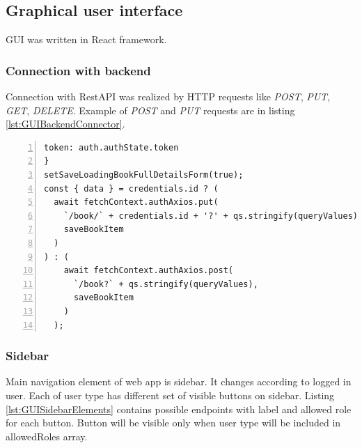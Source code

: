 \subsection{Graphical user interface}
GUI was written in React framework.

\subsubsection{Connection with backend}
Connection with RestAPI was realized by HTTP requests like \textit{POST}, \textit{PUT}, \textit{GET}, \textit{DELETE}. Example of \textit{POST} and \textit{PUT} requests are in listing \ref{lst:GUIBackendConnector}.

\begin{lstlisting}[breaklines=true, numbers=left, stepnumber=1, label={lst:GUIBackendConnector}, caption={Connection with backend through RestAPI}]
token: auth.authState.token
}
setSaveLoadingBookFullDetailsForm(true);
const { data } = credentials.id ? (
  await fetchContext.authAxios.put(
    `/book/` + credentials.id + '?' + qs.stringify(queryValues),
    saveBookItem
  )
) : (
    await fetchContext.authAxios.post(
      `/book?` + qs.stringify(queryValues),
      saveBookItem
    )
  );
\end{lstlisting}

\subsubsection{Sidebar}
Main navigation element of web app is sidebar. It changes according to logged in user. Each of user type has different set of visible buttons on sidebar. Listing \ref{lst:GUISidebarElements} contains possible endpoints with label and allowed role for each button. Button will be visible only when user type will be included in allowedRoles array.

